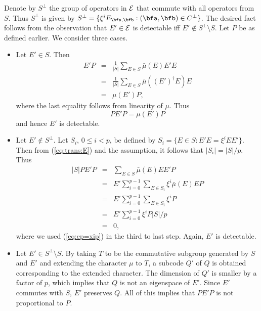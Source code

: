 \documentclass{article}
\begin{document}
Denote by $S^\perp$ the group of operators in ${\cal E}$ that commute
with all operators from $S$. Thus $S^\perp$ is given by $S^\perp =
\{\xi^i E_{\bfa,\bfb}: (\bfa,\bfb)\in C^\perp\}$.  The desired fact
follows from the observation that $E'\in{\cal E}$ is detectable iff
$E'\not\in S^\perp\setminus S$. Let $P$ be as defined
earlier. We consider three cases.
\begin{itemize}
\item[1.] Let $E'\in S$. Then 
\begin{eqnarray}
E'P &=&  \frac{1}{|S|}\sum_{E\in S}\bar\mu(E) E'E \nonumber\\
     &=& \frac{1}{|S|}\sum_{E\in S}\bar\mu((E')^\dagger E) E\nonumber\\
     &=& \mu(E')P\label{eq:ep=xip},
\end{eqnarray}
where the last equality follows from linearity of $\mu$. 
Thus 
$$
PE'P=\mu(E')P
$$
and hence  $E'$ is detectable.

\item[2.] Let $E'\not \in S^\perp$.  Let $S_i$, $0\leq i < p$, be
defined by $S_i = \{ E\in S : E'E = \xi^i EE'\}$.  Then from
(\ref{eq:trans:E}) and the assumption, it follows that $|S_i| = |S|/p$.
Thus
\begin{eqnarray}
|S|PE'P &=& \sum_{E\in S}\bar\mu(E) EE' P\nonumber\\
     &=& E'\sum_{i=0}^{p-1}\sum_{E\in S_i} \xi^i\bar\mu(E) E P\nonumber\\
     &=& E'\sum_{i=0}^{p-1}\sum_{E\in S_i} \xi^i P\nonumber\\
     &=& E'\sum_{i=0}^{p-1}\xi^i P|S|/p\\
     &=& 0,
\end{eqnarray}
where we used (\ref{eq:ep=xip}) in the third to last step.
Again, $E'$ is detectable.

\item[3.] Let $E'\in S^\perp\setminus S$.  By taking $T$ to be the
commutative subgroup generated by $S$ and $E'$ and extending the
character $\mu$ to $T$, a subcode $Q'$ of $Q$ is obtained
corresponding to the extended character. The dimension of $Q'$ is
smaller by a factor of $p$, which implies that $Q$ is not an
eigenspace of $E'$. Since $E'$ commutes with $S$, $E'$ preserves $Q$.
All of this implies that $PE'P$ is not proportional to $P$.
\end{itemize}
\end{document}

